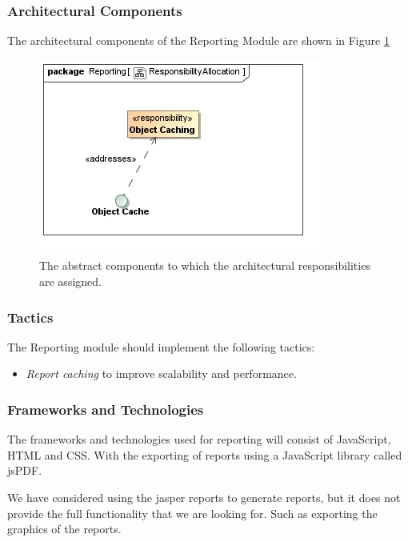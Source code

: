 \subsubsection{Architectural Components}
The architectural components of the Reporting Module are shown in Figure \ref{fig:reportingResponsibilityAllocation}
\begin{figure}[H]
	\begin{center}
	\includegraphics[scale=0.5]{../Diagrams and Charts/Reporting/ResponsibilityAllocation.jpg}
	\caption{The abstract components to which the architectural responsibilities are assigned.}
	\label{fig:reportingResponsibilityAllocation}
	\end{center}
\end{figure}



\subsubsection{Tactics}
The Reporting module should implement the following tactics:
\begin{itemize}
  \item \textit{Report caching} to improve scalability and performance.
\end{itemize}



\subsubsection{Frameworks and Technologies}
The frameworks and technologies used for reporting will consist of JavaScript,
HTML and CSS. With the exporting of reports using a JavaScript library called jsPDF.

We have considered using the jasper reports to generate reports, but it does
 not provide the full functionality that we are looking for. Such as exporting the graphics of the reports.

